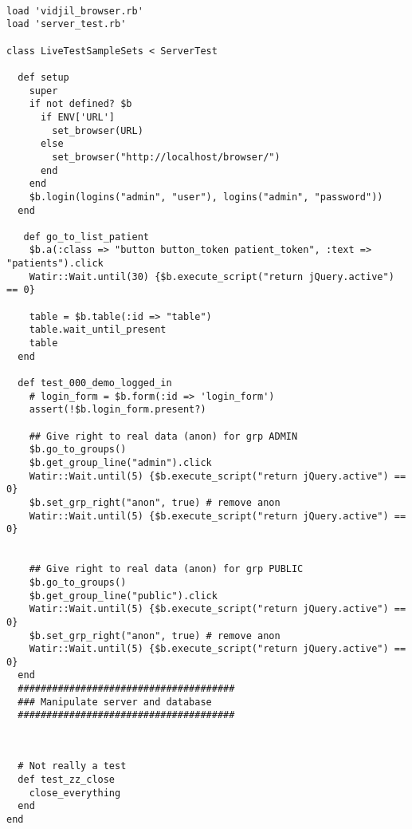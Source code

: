 
\begin{verbatim}

load 'vidjil_browser.rb'
load 'server_test.rb'

class LiveTestSampleSets < ServerTest

  def setup
    super
    if not defined? $b
      if ENV['URL']
        set_browser(URL)
      else
        set_browser("http://localhost/browser/")
      end
    end
    $b.login(logins("admin", "user"), logins("admin", "password"))
  end

   def go_to_list_patient
    $b.a(:class => "button button_token patient_token", :text => "patients").click
    Watir::Wait.until(30) {$b.execute_script("return jQuery.active") == 0}

    table = $b.table(:id => "table")
    table.wait_until_present
    table
  end

  def test_000_demo_logged_in
    # login_form = $b.form(:id => 'login_form')
    assert(!$b.login_form.present?)

    ## Give right to real data (anon) for grp ADMIN
    $b.go_to_groups()
    $b.get_group_line("admin").click
    Watir::Wait.until(5) {$b.execute_script("return jQuery.active") == 0}
    $b.set_grp_right("anon", true) # remove anon
    Watir::Wait.until(5) {$b.execute_script("return jQuery.active") == 0}


    ## Give right to real data (anon) for grp PUBLIC
    $b.go_to_groups()
    $b.get_group_line("public").click
    Watir::Wait.until(5) {$b.execute_script("return jQuery.active") == 0}
    $b.set_grp_right("anon", true) # remove anon
    Watir::Wait.until(5) {$b.execute_script("return jQuery.active") == 0}
  end
  ######################################
  ### Manipulate server and database
  ######################################


\end{verbatim}



\begin{verbatim}

  # Not really a test
  def test_zz_close
    close_everything
  end
end
\end{verbatim}
